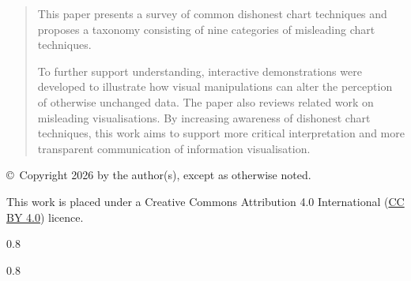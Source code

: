 \documentclass[11pt,onecolumn,twoside]{report}
\newcommand{\thisyear}{2026}         %
\begin{document}
\begin{titlepage}
\begin{quote}
This paper presents a survey of common dishonest chart techniques and proposes a taxonomy consisting of nine categories of misleading chart techniques.

To further support understanding, interactive demonstrations were developed to illustrate how visual manipulations can alter the perception of otherwise unchanged data. The paper also reviews related work on misleading visualisations. By increasing awareness of dishonest chart techniques, this work aims to support more critical interpretation and more transparent communication of information visualisation.
\end{quote}

\vfill

\begin{center}
{\footnotesize\sffamily \copyright~Copyright \thisyear{} by the author(s),
except as otherwise noted.}

\vspace{2mm}
{\footnotesize\sffamily This work is placed under a
Creative Commons Attribution 4.0 International
(\href{https://creativecommons.org/licenses/by/4.0/}{CC BY 4.0}) licence.}
\end{center}

\end{titlepage}




\pagestyle{plain}             %


\begin{spacing}{0.8}
\tableofcontents
\end{spacing}

\begin{spacing}{0.8}
\listoffigures
\end{spacing}


\pagestyle{main}              %
















\begin{otherlanguage}{english}
\printbibliography[heading=bibintoc]
\end{otherlanguage}
\end{document}
